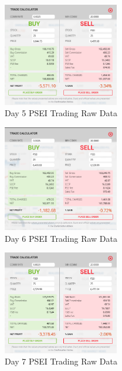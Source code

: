 \begin{figure}[ht]
    \centering
    \includegraphics[width=0.45\textwidth]{./assets/Appendices/B/RawTestsData/PSEI_baseline/day5.png}
    \caption{Day 5 PSEI Trading Raw Data}
    \label{fig:PSEIday5}
\end{figure}
\FloatBarrier

\begin{figure}[ht]
    \centering
    \includegraphics[width=0.45\textwidth]{./assets/Appendices/B/RawTestsData/PSEI_baseline/day6.png}
    \caption{Day 6 PSEI Trading Raw Data}
    \label{fig:PSEIday6}
\end{figure}
\FloatBarrier

\begin{figure}[ht]
    \centering
    \includegraphics[width=0.45\textwidth]{./assets/Appendices/B/RawTestsData/PSEI_baseline/day7.png}
    \caption{Day 7 PSEI Trading Raw Data}
    \label{fig:PSEIday7}
\end{figure}
\FloatBarrier

